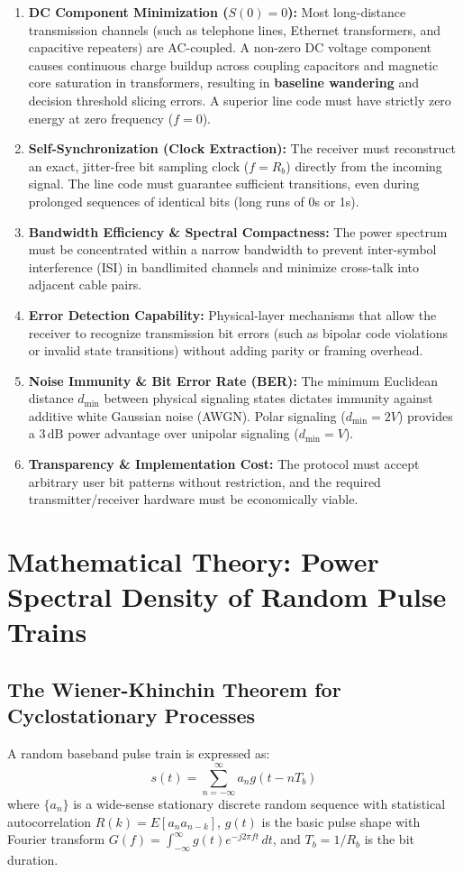 \documentclass[11pt,a4paper]{article}
\begin{document}
\begin{enumerate}
    \item \textbf{DC Component Minimization ($S(0) = 0$):} Most long-distance transmission channels (such as telephone lines, Ethernet transformers, and capacitive repeaters) are AC-coupled. A non-zero DC voltage component causes continuous charge buildup across coupling capacitors and magnetic core saturation in transformers, resulting in \textbf{baseline wandering} and decision threshold slicing errors. A superior line code must have strictly zero energy at zero frequency ($f = 0$).
    \item \textbf{Self-Synchronization (Clock Extraction):} The receiver must reconstruct an exact, jitter-free bit sampling clock ($f = R_b$) directly from the incoming signal. The line code must guarantee sufficient transitions, even during prolonged sequences of identical bits (long runs of 0s or 1s).
    \item \textbf{Bandwidth Efficiency \& Spectral Compactness:} The power spectrum must be concentrated within a narrow bandwidth to prevent inter-symbol interference (ISI) in bandlimited channels and minimize cross-talk into adjacent cable pairs.
    \item \textbf{Error Detection Capability:} Physical-layer mechanisms that allow the receiver to recognize transmission bit errors (such as bipolar code violations or invalid state transitions) without adding parity or framing overhead.
    \item \textbf{Noise Immunity \& Bit Error Rate (BER):} The minimum Euclidean distance $d_{\min}$ between physical signaling states dictates immunity against additive white Gaussian noise (AWGN). Polar signaling ($d_{\min} = 2V$) provides a $3\,\mathrm{dB}$ power advantage over unipolar signaling ($d_{\min} = V$).
    \item \textbf{Transparency \& Implementation Cost:} The protocol must accept arbitrary user bit patterns without restriction, and the required transmitter/receiver hardware must be economically viable.
\end{enumerate}

\section{Mathematical Theory: Power Spectral Density of Random Pulse Trains}

\subsection{The Wiener-Khinchin Theorem for Cyclostationary Processes}
A random baseband pulse train is expressed as:
\begin{equation}
s(t) = \sum_{n=-\infty}^{\infty} a_n g(t - n T_b)
\end{equation}
where $\{a_n\}$ is a wide-sense stationary discrete random sequence with statistical autocorrelation $R(k) = E[a_n a_{n-k}]$, $g(t)$ is the basic pulse shape with Fourier transform $G(f) = \int_{-\infty}^{\infty} g(t) e^{-j 2\pi f t} \, dt$, and $T_b = 1 / R_b$ is the bit duration.
\end{document}
